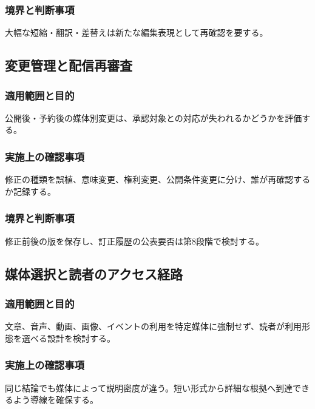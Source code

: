 \documentclass[a4paper,11pt]{article}
\begin{document}
\subsubsection{境界と判断事項}
\par 大幅な短縮・翻訳・差替えは新たな編集表現として再確認を要する。\par\medskip
\subsection{変更管理と配信再審査}
\subsubsection{適用範囲と目的}
\par 公開後・予約後の媒体別変更は、承認対象との対応が失われるかどうかを評価する。\par\medskip
\subsubsection{実施上の確認事項}
\par 修正の種類を誤植、意味変更、権利変更、公開条件変更に分け、誰が再確認するか記録する。\par\medskip
\subsubsection{境界と判断事項}
\par 修正前後の版を保存し、訂正履歴の公表要否は第8段階で検討する。\par\medskip
\subsection{媒体選択と読者のアクセス経路}
\subsubsection{適用範囲と目的}
\par 文章、音声、動画、画像、イベントの利用を特定媒体に強制せず、読者が利用形態を選べる設計を検討する。\par\medskip
\subsubsection{実施上の確認事項}
\par 同じ結論でも媒体によって説明密度が違う。短い形式から詳細な根拠へ到達できるよう導線を確保する。\par\medskip
\end{document}
